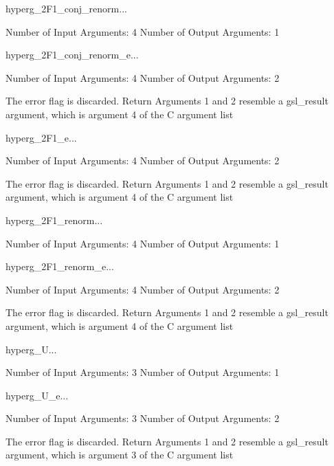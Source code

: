 \begin{funcdesc}{hyperg_2F1_conj_renorm}{...}

    Number of Input  Arguments:  4
    Number of Output Arguments:  1
\end{funcdesc}

\begin{funcdesc}{hyperg_2F1_conj_renorm_e}{...}

    Number of Input  Arguments:  4
    Number of Output Arguments:  2

The error flag is discarded.
Return Arguments 1 and 2 resemble a gsl_result argument,
	which is  argument 4 of the C argument list

\end{funcdesc}

\begin{funcdesc}{hyperg_2F1_e}{...}

    Number of Input  Arguments:  4
    Number of Output Arguments:  2

The error flag is discarded.
Return Arguments 1 and 2 resemble a gsl_result argument,
	which is  argument 4 of the C argument list

\end{funcdesc}

\begin{funcdesc}{hyperg_2F1_renorm}{...}

    Number of Input  Arguments:  4
    Number of Output Arguments:  1
\end{funcdesc}

\begin{funcdesc}{hyperg_2F1_renorm_e}{...}

    Number of Input  Arguments:  4
    Number of Output Arguments:  2

The error flag is discarded.
Return Arguments 1 and 2 resemble a gsl_result argument,
	which is  argument 4 of the C argument list

\end{funcdesc}

\begin{funcdesc}{hyperg_U}{...}

    Number of Input  Arguments:  3
    Number of Output Arguments:  1
\end{funcdesc}

\begin{funcdesc}{hyperg_U_e}{...}

    Number of Input  Arguments:  3
    Number of Output Arguments:  2

The error flag is discarded.
Return Arguments 1 and 2 resemble a gsl_result argument,
	which is  argument 3 of the C argument list

\end{funcdesc}

